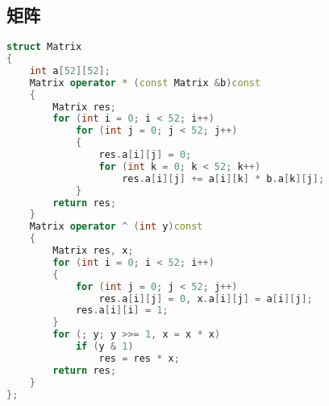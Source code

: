 \subsection{矩阵}
    \begin{lstlisting}[language=c++]
struct Matrix
{
    int a[52][52];
    Matrix operator * (const Matrix &b)const
    {
        Matrix res;
        for (int i = 0; i < 52; i++)
            for (int j = 0; j < 52; j++)
            {
                res.a[i][j] = 0;
                for (int k = 0; k < 52; k++)
                    res.a[i][j] += a[i][k] * b.a[k][j];
            }
        return res;
    }
    Matrix operator ^ (int y)const
    {
        Matrix res, x;
        for (int i = 0; i < 52; i++)
        {
            for (int j = 0; j < 52; j++)
                res.a[i][j] = 0, x.a[i][j] = a[i][j];
            res.a[i][i] = 1;
        }
        for (; y; y >>= 1, x = x * x)
            if (y & 1)
                res = res * x;
        return res;
    }
};
    \end{lstlisting}